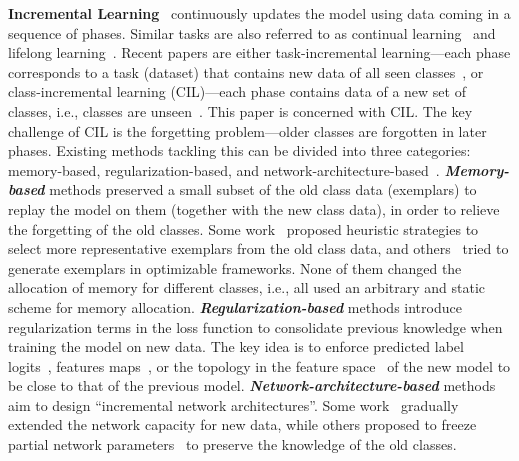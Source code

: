 \documentclass{article}
\newcommand{\myparagraph}[1]{\vspace{0.1em}\noindent\textbf{#1}}
\begin{document}
\myparagraph{Incremental Learning}~\cite{iscen2020memory,rajasegaran2019random,simon2021learning,wu2021incremental,zhu2021prototype} continuously updates the model using data coming in a sequence of phases. 
Similar tasks are also referred to as continual learning~\cite{de2019continualsurvey,lopez2017gradient} and lifelong learning~\cite{aljundi2017expert,chen2018lifelong}.
Recent papers are either task-incremental learning---each phase corresponds to a task (dataset) that contains new data of all seen classes~\cite{chaudhry2018efficient,davidson2020sequential,hu2018overcoming,Li18LWF,riemer2018learning,shin2017continual,zhao2020maintaining}, 
or class-incremental learning (CIL)---each phase contains data of a new set of classes, i.e., classes are unseen~\cite{belouadah2019il2m,Castro18EndToEnd,hou2019lucir,Kukleva_2021_ICCV,liu2020mnemonics,rajasegaran2020itaml,rebuffi2017icarl,ren2018incremental,Tao2020topology,Wu2019LargeScale,yu2020CVPRsemantic,Zhang_2021_ICCV,zhao2020maintaining}. 
This paper is concerned with CIL. 
The key challenge of CIL is the forgetting problem---older classes are forgotten in later phases. 
Existing methods tackling this can be divided into three categories:
memory-based, regularization-based, and network-architecture-based~\cite{de2019literaturereview,prabhu12356gdumb}. 
\myparagraph{\emph{Memory-based}} methods preserved a small subset of the old class data (exemplars) to replay the model on them (together with the new class data), in order to relieve the forgetting of the old classes. 
Some work~\cite{hou2019lucir,rebuffi2017icarl} proposed heuristic strategies to select more representative exemplars from the old class data, and  others~\cite{liu2020mnemonics,shin2017continual} tried to generate exemplars in optimizable frameworks. None of them changed the allocation of memory for different classes, i.e., all used an arbitrary and static scheme for memory allocation.
\myparagraph{\emph{Regularization-based}} methods introduce regularization terms in the loss function to consolidate previous knowledge when training the model on new data. The key idea is to enforce predicted label logits~\cite{Li18LWF,rebuffi2017icarl}, features maps~\cite{douillard2020podnet,hou2019lucir}, or the topology in the feature space~\cite{Tao2020topology} of the new model to be close to that of the previous model.
\myparagraph{\emph{Network-architecture-based}} methods aim to design ``incremental network architectures''. Some work~\cite{rusu2016progressive,xu2018reinforced} gradually extended the network capacity for new data, while others proposed to freeze partial network parameters~\cite{abati2020conditional,Liu2020AANets} to preserve the knowledge of the old classes.
\end{document}
